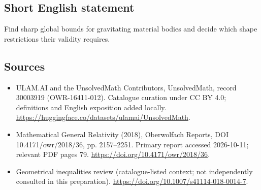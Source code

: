 \documentclass[11pt]{article}
\begin{document}
\subsection{Short English statement}
Find sharp global bounds for gravitating material bodies and decide which shape restrictions their validity requires.
\subsection{Sources}
\begin{itemize}
\item[\hypertarget{source:30003919:1}{S1}] ULAM.AI and the UnsolvedMath Contributors, UnsolvedMath, record 30003919 (OWR-16411-012). Catalogue curation under CC BY 4.0; definitions and English exposition added locally.
\url{https://huggingface.co/datasets/ulamai/UnsolvedMath}.
\item[\hypertarget{source:30003919:2}{S2}] Mathematical General Relativity (2018), Oberwolfach Reports, DOI 10.4171/owr/2018/36, pp. 2157--2251. Primary report accessed 2026-10-11; relevant PDF pages 79.
\url{https://doi.org/10.4171/owr/2018/36}.
\item[\hypertarget{source:30003919:3}{S3}] Geometrical inequalities review (catalogue-listed context; not independently consulted in this preparation).
\url{https://doi.org/10.1007/s41114-018-0014-7}.
\end{itemize}
\label{end:30003919}
\end{document}
